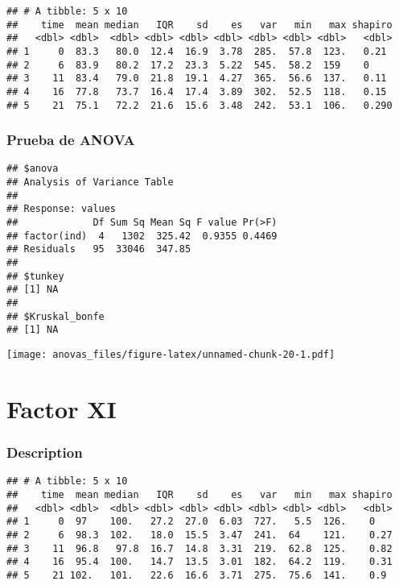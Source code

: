 \documentclass[
]{article}
\begin{document}
\begin{verbatim}
## # A tibble: 5 x 10
##    time  mean median   IQR    sd    es   var   min   max shapiro
##   <dbl> <dbl>  <dbl> <dbl> <dbl> <dbl> <dbl> <dbl> <dbl>   <dbl>
## 1     0  83.3   80.0  12.4  16.9  3.78  285.  57.8  123.   0.21 
## 2     6  83.9   80.2  17.2  23.3  5.22  545.  58.2  159    0    
## 3    11  83.4   79.0  21.8  19.1  4.27  365.  56.6  137.   0.11 
## 4    16  77.8   73.7  16.4  17.4  3.89  302.  52.5  118.   0.15 
## 5    21  75.1   72.2  21.6  15.6  3.48  242.  53.1  106.   0.290
\end{verbatim}

\hypertarget{prueba-de-anova-9}{%
\subsubsection{Prueba de ANOVA}\label{prueba-de-anova-9}}

\begin{verbatim}
## $anova
## Analysis of Variance Table
## 
## Response: values
##             Df Sum Sq Mean Sq F value Pr(>F)
## factor(ind)  4   1302  325.42  0.9355 0.4469
## Residuals   95  33046  347.85               
## 
## $tunkey
## [1] NA
## 
## $Kruskal_bonfe
## [1] NA
\end{verbatim}

\texttt{[image: anovas\_files/figure-latex/unnamed-chunk-20-1.pdf]}

\hypertarget{factor-xi}{%
\section{Factor XI}\label{factor-xi}}

\hypertarget{description-10}{%
\subsubsection{Description}\label{description-10}}

\begin{verbatim}
## # A tibble: 5 x 10
##    time  mean median   IQR    sd    es   var   min   max shapiro
##   <dbl> <dbl>  <dbl> <dbl> <dbl> <dbl> <dbl> <dbl> <dbl>   <dbl>
## 1     0  97    100.   27.2  27.0  6.03  727.   5.5  126.    0   
## 2     6  98.3  102.   18.0  15.5  3.47  241.  64    121.    0.27
## 3    11  96.8   97.8  16.7  14.8  3.31  219.  62.8  125.    0.82
## 4    16  95.4  100.   14.7  13.5  3.01  182.  64.2  119.    0.31
## 5    21 102.   101.   22.6  16.6  3.71  275.  75.6  141.    0.9
\end{verbatim}
\end{document}

